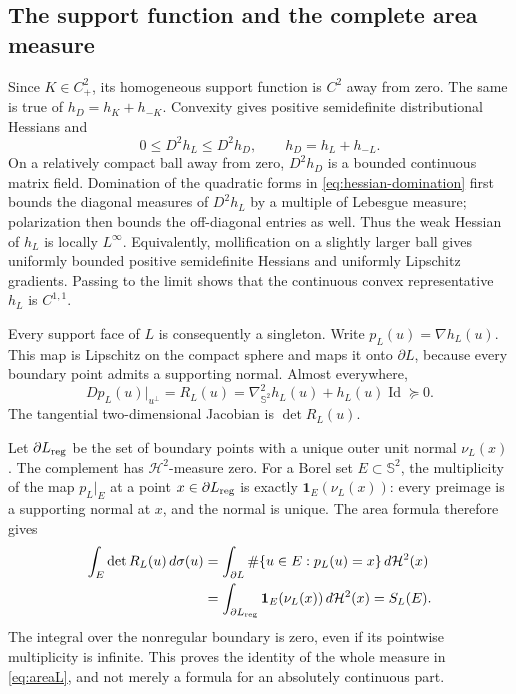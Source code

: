 \documentclass[11pt,a4paper]{article}
\theoremstyle{definition}
\theoremstyle{remark}
\newcommand{\Sph}{\mathbb S^2}
\newcommand{\area}{\mathcal H^2}
\newcommand{\id}{\operatorname{Id}}
\numberwithin{equation}{section}
\begin{document}
\subsection{The support function and the complete area measure}
Since $K\in C^2_+$, its homogeneous support function is $C^2$ away from
zero. The same is true of $h_D=h_K+h_{-K}$. Convexity gives positive
semidefinite distributional Hessians and
\begin{equation}\label{eq:hessian-domination}
 0\le D^2h_L\le D^2h_D,\qquad h_D=h_L+h_{-L}.
\end{equation}
On a relatively compact ball away from zero, $D^2h_D$ is a bounded
continuous matrix field. Domination of the quadratic forms in
\eqref{eq:hessian-domination} first bounds the diagonal measures of
$D^2h_L$ by a multiple of Lebesgue measure; polarization then bounds
the off-diagonal entries as well. Thus the weak Hessian of $h_L$ is
locally $L^\infty$. Equivalently, mollification on a slightly larger
ball gives uniformly bounded positive semidefinite Hessians and uniformly
Lipschitz gradients. Passing to the limit shows that the continuous
convex representative $h_L$ is $C^{1,1}$.

Every support face of $L$ is consequently a singleton. Write
$p_L(u)=\nabla h_L(u)$. This map is Lipschitz on the compact sphere
and maps it onto $\partial L$, because every boundary point admits
a supporting normal. Almost everywhere,
\[
 Dp_L(u)|_{u^\perp}=R_L(u)
   =\nabla_{\Sph}^2h_L(u)+h_L(u)\id\succeq0 .
\]
The tangential two-dimensional Jacobian is $\det R_L(u)$.

Let $\partial L_{\rm reg}$ be the set of boundary points with a unique
outer unit normal $\nu_L(x)$. The complement has $\area$-measure zero.
For a Borel set $E\subset\Sph$, the multiplicity of the map $p_L|_E$
at a point $x\in\partial L_{\rm reg}$ is exactly
$\mathbf1_E(\nu_L(x))$: every preimage is a supporting normal at $x$,
and the normal is unique. The area formula therefore gives
\begin{align}
 \int_E\det R_L(u)\,d\sigma(u)
 &=\int_{\partial L}\#\{u\in E:p_L(u)=x\}\,d\area(x)\notag\\
 &=\int_{\partial L_{\rm reg}}\mathbf1_E(\nu_L(x))\,d\area(x)
 =S_L(E).\label{eq:area-formula}
\end{align}
The integral over the nonregular boundary is zero, even if its
pointwise multiplicity is infinite. This proves the identity of the
whole measure in \eqref{eq:areaL}, and not merely a formula for an
absolutely continuous part.
\end{document}
